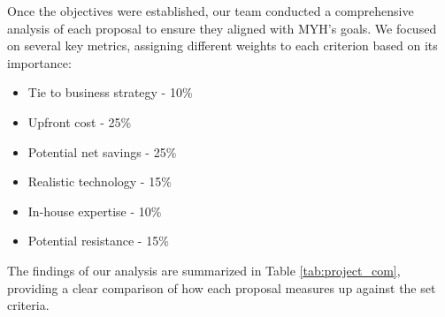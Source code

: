 Once the objectives were established, our team conducted a comprehensive analysis of each proposal to ensure they aligned with MYH's goals. We focused on several key metrics, assigning different weights to each criterion based on its importance:

\begin{itemize}
    \item Tie to business strategy - 10\%
    \item Upfront cost - 25\%
    \item Potential net savings - 25\%
    \item Realistic technology - 15\%
    \item In-house expertise - 10\%
    \item Potential resistance - 15\%
\end{itemize}

The findings of our analysis are summarized in Table \ref{tab:project_com}, providing a clear comparison of how each proposal measures up against the set criteria.

